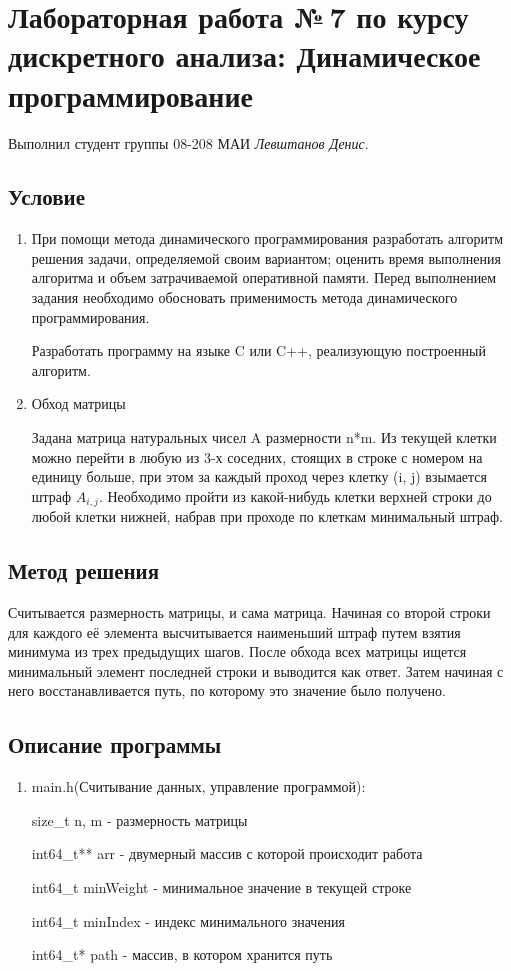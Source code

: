 \documentclass[12pt]{article}
\begin{document}
\section*{Лабораторная работа №\,7 по курсу дискретного анализа: Динамическое программирование}

Выполнил студент группы 08-208 МАИ \textit{Левштанов Денис}.

\subsection*{Условие}

\begin{enumerate}
\item При помощи метода динамического программирования разработать алгоритм решения задачи, определяемой своим вариантом; оценить время выполнения алгоритма и объем затрачиваемой оперативной памяти. Перед выполнением задания необходимо обосновать применимость метода динамического программирования.

Разработать программу на языке C или C++, реализующую построенный алгоритм. 
\item Обход матрицы

Задана матрица натуральных чисел A размерности n*m. Из текущей клетки можно перейти в любую из 3-х соседних, стоящих в строке с номером на единицу больше, при этом за каждый проход через клетку (i, j) взымается штраф $A_{i,j}$. Необходимо пройти из какой-нибудь клетки верхней строки до любой клетки нижней, набрав при проходе по клеткам минимальный штраф.

\end{enumerate}

\subsection*{Метод решения}
\par Считывается размерность матрицы, и сама матрица. Начиная со второй строки для каждого её элемента высчитывается наименьший штраф путем взятия минимума из трех предыдущих шагов. После обхода всех матрицы ищется минимальный элемент последней строки и выводится как ответ. Затем начиная с него восстанавливается путь, по которому это значение было получено.

\subsection*{Описание программы}

\begin{enumerate}
\item main.h(Считывание данных, управление программой):
\par size\_t n, m - размерность матрицы
\par int64\_t** arr - двумерный массив с которой происходит работа
\par int64\_t minWeight - минимальное значение в текущей строке
\par int64\_t minIndex - индекс минимального значения
\par int64\_t* path - массив, в котором хранится путь
\end{enumerate}
\end{document}
